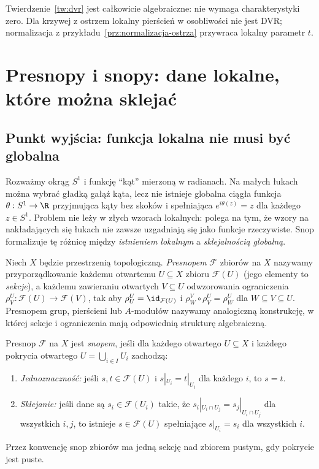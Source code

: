 \begin{uwaga}
Twierdzenie~\ref{tw:dvr} jest całkowicie algebraiczne:
nie wymaga charakterystyki zero. Dla krzywej z ostrzem
lokalny pierścień w osobliwości nie jest DVR;
normalizacja z przykładu~\ref{prz:normalizacja-ostrza}
przywraca lokalny parametr $t$.
\end{uwaga}

\section{Presnopy i snopy: dane lokalne, które można sklejać}
\label{sec:snopy}

\subsection{Punkt wyjścia: funkcja lokalna nie musi być globalna}
Rozważmy okrąg $S^1$ i funkcję ``kąt'' mierzoną w radianach.
Na małych łukach można wybrać gładką gałąź kąta, lecz
nie istnieje globalna ciągła funkcja $\theta:S^1\to\R$
przyjmująca kąty bez skoków i spełniająca
$e^{i\theta(z)}=z$ dla każdego $z\in S^1$.
Problem nie leży w złych wzorach lokalnych: polega na tym,
że wzory na nakładających się łukach nie zawsze
uzgadniają się jako funkcje rzeczywiste. Snop formalizuje
tę różnicę między \emph{istnieniem lokalnym} a
\emph{sklejalnością globalną}.

\begin{definicja}
Niech $X$ będzie przestrzenią topologiczną.
\emph{Presnopem} $\mathcal F$ zbiorów na $X$ nazywamy
przyporządkowanie każdemu otwartemu $U\subseteq X$
zbioru $\mathcal F(U)$ (jego elementy to \emph{sekcje}),
a każdemu zawieraniu otwartych $V\subseteq U$
odwzorowania ograniczenia
$\rho^U_V:\mathcal F(U)\to\mathcal F(V)$, tak aby
$\rho^U_U=\id_{\mathcal F(U)}$ i
$\rho^V_W\circ\rho^U_V=\rho^U_W$ dla $W\subseteq V\subseteq U$.
Presnopem grup, pierścieni lub $A$-modułów nazywamy
analogiczną konstrukcję, w której sekcje i ograniczenia
mają odpowiednią strukturę algebraiczną.
\end{definicja}

\begin{definicja}[Snop]
\label{def:snop}
Presnop $\mathcal F$ na $X$ jest \emph{snopem},
jeśli dla każdego otwartego $U\subseteq X$ i każdego
pokrycia otwartego $U=\bigcup_{i\in I}U_i$ zachodzą:
\begin{enumerate}[label=(S\arabic*)]
\item \emph{Jednoznaczność:} jeśli $s,t\in\mathcal F(U)$
i $s|_{U_i}=t|_{U_i}$ dla każdego $i$, to $s=t$.
\item \emph{Sklejanie:} jeśli dane są $s_i\in\mathcal F(U_i)$
takie, że $s_i|_{U_i\cap U_j}=s_j|_{U_i\cap U_j}$
dla wszystkich $i,j$, to istnieje $s\in\mathcal F(U)$
spełniające $s|_{U_i}=s_i$ dla wszystkich $i$.
\end{enumerate}
Przez konwencję snop zbiorów ma jedną sekcję nad
zbiorem pustym, gdy pokrycie jest puste.
\end{definicja}

